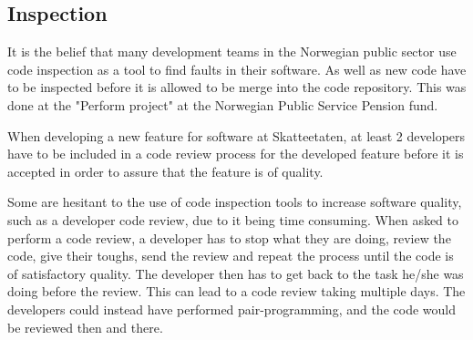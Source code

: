 




\subsection{Inspection}
It is the belief that many development teams in the Norwegian public sector use code inspection as a tool to find faults in their software. As well as new code have to be inspected before it is allowed to be merge into the code repository. This was done at the "Perform project" at the Norwegian Public Service Pension fund.

When developing a new feature for software at Skatteetaten, at least 2 developers have to be included in a code review process for the developed feature before it is accepted in order to assure that the feature is of quality.

Some are hesitant to the use of code inspection tools to increase software quality, such as a developer code review, due to it being time consuming. When asked to perform a code review, a developer has to stop what they are doing, review the code, give their toughs, send the review and repeat the process until the code is of satisfactory quality. The developer then has to get back to the task he/she was doing before the review. This can lead to a code review taking multiple days. The developers could instead have performed pair-programming, and the code would be reviewed then and there. 

